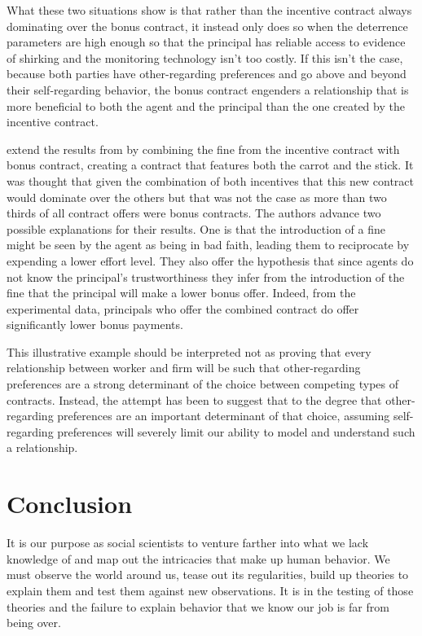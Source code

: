 \documentclass[12pt]{article}
\begin{document}
What these two situations show is that rather than the incentive contract always dominating over the bonus contract, it instead only does so when the deterrence parameters are high enough so that the principal has reliable access to evidence of shirking and the monitoring technology isn't too costly. If this isn't the case, because both parties have other-regarding preferences and go above and beyond their self-regarding behavior, the bonus contract engenders a relationship that is more beneficial to both the agent and the principal than the one created by the incentive contract.

\cite{fehr2007adding} extend the results from \cite{fehr2007fairness} by combining the fine from the incentive contract with bonus contract, creating a contract that features both the carrot and the stick. It was thought that given the combination of both incentives that this new contract would dominate over the others but that was not the case as more than two thirds of all contract offers were bonus contracts. The authors advance two possible explanations for their results. One is that the introduction of a fine might be seen by the agent as being in bad faith, leading them to reciprocate by expending a lower effort level. They also offer the hypothesis that since agents do not know the principal's trustworthiness they infer from the introduction of the fine that the principal will make a lower bonus offer. Indeed, from the experimental data, principals who offer the combined contract do offer significantly lower bonus payments.

This illustrative example should be interpreted not as proving that every relationship between worker and firm will be such that other-regarding preferences are a strong determinant of the choice between competing types of contracts. Instead, the attempt has been to suggest that to the degree that other-regarding preferences are an important determinant of that choice, assuming self-regarding preferences will severely limit our ability to model and understand such a relationship.

\section{Conclusion}

It is our purpose as social scientists to venture farther into what we lack knowledge of and map out the intricacies that make up human behavior. We must observe the world around us, tease out its regularities, build up theories to explain them and test them against new observations. It is in the testing of those theories and the failure to explain behavior that we know our job is far from being over.
\end{document}
